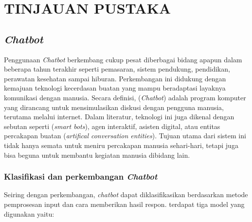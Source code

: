 \chapter{TINJAUAN PUSTAKA}
\label{BAB2:tinjauan}

\section{\textit{Chatbot}}
Penggunaan \textit{Chatbot} berkembang cukup pesat diberbagai bidang apapun dalam beberapa tahun terakhir seperti pemasaran, sistem pendukung, pendidikan, perawatan kesehatan sampai hiburan. Perkembangan ini didukung dengan kemajuan teknologi kecerdasan buatan yang mampu beradaptasi layaknya komunikasi dengan manusia. 
Secara definisi, (\textit{Chatbot}) adalah program komputer yang dirancang untuk mensimulasikan diskusi dengan pengguna manusia, terutama melalui internet. Dalam literatur, teknologi ini juga dikenal dengan sebutan seperti (\textit{smart bots}), agen interaktif, asisten digital, atau entitas percakapan buatan (\textit{artifical conversation entities}).
Tujuan utama dari sistem ini tidak hanya semata untuk meniru percakapan manusia sehari-hari, tetapi juga bisa beguna untuk membantu kegiatan manusia dibidang lain.

\subsection{Klasifikasi dan perkembangan \textit{Chatbot}}
Seiring dengan perkembangan, \textit{chatbot} dapat diklasifikasikan berdasarkan metode pemprosesan input dan cara memberikan hasil respon. terdapat tiga model yang digunakan yaitu:


